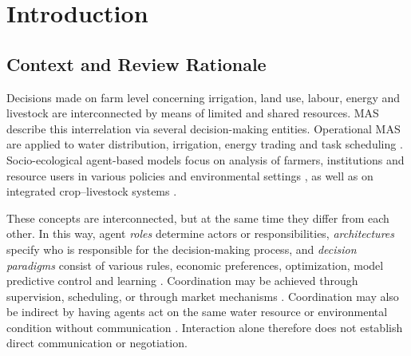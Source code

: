 \documentclass[11pt,a4paper]{article}
\begin{document}
\clearpage


\setcounter{tocdepth}{2}
\tableofcontents

\clearpage




\section{Introduction}
\label{sec:introduction}

\subsection{Context and Review Rationale}

Decisions made on farm level concerning irrigation, land use, labour, energy and livestock are interconnected by means of limited and shared resources. MAS describe this interrelation via several decision-making entities. Operational MAS are applied to water distribution, irrigation, energy trading and task scheduling
\parencite{chiewchan_water_2023,jimenez_intelligent_2022,
agyeman_semi-centralized_2025,shah_peer--peer_2024,
harman_multi-agent_2022}. Socio-ecological agent-based models focus on analysis of farmers, institutions and resource users in various policies and environmental settings
\parencite{berger_agent-based_2001,therond_integrated_2014,
schreinemachers_agent-based_2011,feuillette_sinuse_2003},
as well as on integrated crop–livestock systems
\parencite{catarino_fostering_2021}.

These concepts are interconnected, but at the same time they differ from each other. In this way, agent \emph{roles} determine actors or responsibilities, \emph{architectures} specify who is responsible for the decision-making process, and \emph{decision paradigms} consist of various rules, economic preferences, optimization, model predictive control and learning
\parencite{agyeman_learning-based_2024,schoonen_optimal_2019,
grovermann_smart_2017}. Coordination may be achieved through supervision, scheduling, or through market mechanisms
\parencite{chiewchan_improving_2020,cobbenhagen_heterogeneous_2018}.
Coordination may also be indirect by having agents act on the same water resource or environmental condition without communication
\parencite{cai_agent-based_2017,tamburino_water_2020,
barreteau_suitability_2004}. Interaction alone therefore does not
establish direct communication or negotiation.
\end{document}
